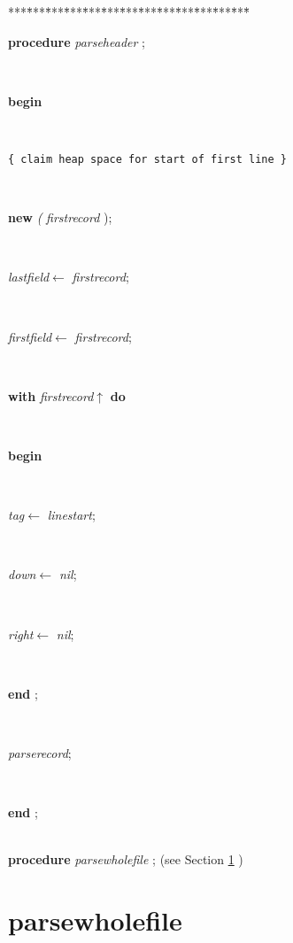 \begin{tabbing}
***\=***\=***\=***\=***\=***\=***\=***\=***\=***\=***\=***\=***\=\kill
\parbox{14cm}{\textsf{\textbf{procedure}  \textit{parseheader} ;}}\\
\+\parbox{14cm}{\textsf{\textbf{begin} }}\\
\parbox{14cm}{\texttt{\small{\{ claim heap space for start of first line \}}}}\\
\parbox{14cm}{\textsf{\textbf{new} \textit{(} \textit{firstrecord} );}}\\
\parbox{14cm}{\textsf{\textit{lastfield}$\leftarrow$ \textit{firstrecord}}; }\\
\parbox{14cm}{\textsf{\textit{firstfield}$\leftarrow$ \textit{firstrecord}}; }\\
\+\parbox{14cm}{\textsf {\textbf {with } \textsf{\textit{firstrecord}$\uparrow$\textit{}} \textbf{ do } }}\\
\<\parbox{14cm}{\textsf{\textbf{begin} }}\\
\parbox{14cm}{\textsf{\textit{tag}$\leftarrow$ \textit{linestart}}; }\\
\parbox{14cm}{\textsf{\textit{down}$\leftarrow$ \textit{nil}}; }\\
\parbox{14cm}{\textsf{\textit{right}$\leftarrow$ \textit{nil}}; }\\
\<\-\parbox{14cm}{\textsf{\textbf{end} ;}}\\
\parbox{14cm}{\textsf{\textit{parserecord}}; }\\
\<\-\parbox{14cm}{\textsf{\textbf{end} ;}}\\
\+\textsf{\textbf{procedure}  \textit{parsewholefile} ;} (see Section \ref{sec:csvfilereader/getdatamatrix/recursedown/recurse/getcolheaders/recurse/getrowheaders/recurse/colcount/getcell/removetrailingnull/onlynulls/rowcount/isint/printcsv/parsecsvfile/thetoken/peek/isoneof/nextsymbol/have/haveoneof/initialise/resolvealpha/resolvedigits/resolvetoken/markbegin/markend/setalpha/emptyfield/parsebarefield/parsedelimitedfield/appendcurrentchar/parsefield/parserecord/parseheaderparsewholefile} )\\
\end{tabbing}
\section{parsewholefile}\label{sec:csvfilereader/getdatamatrix/recursedown/recurse/getcolheaders/recurse/getrowheaders/recurse/colcount/getcell/removetrailingnull/onlynulls/rowcount/isint/printcsv/parsecsvfile/thetoken/peek/isoneof/nextsymbol/have/haveoneof/initialise/resolvealpha/resolvedigits/resolvetoken/markbegin/markend/setalpha/emptyfield/parsebarefield/parsedelimitedfield/appendcurrentchar/parsefield/parserecord/parseheaderparsewholefile}

